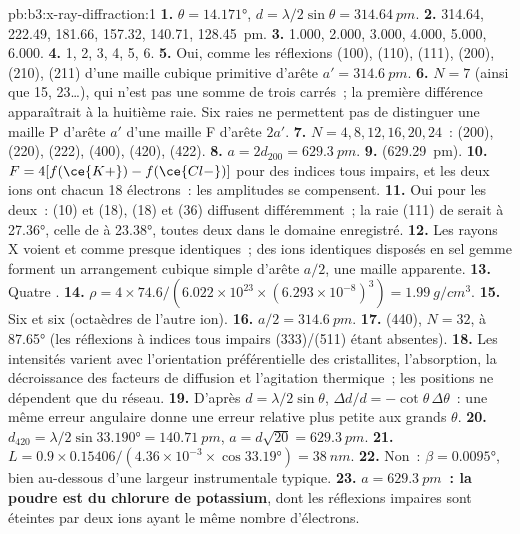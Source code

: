 \begin{solution}{pb:b3:x-ray-diffraction:1}
\textbf{1.} $\theta = \ang{14.171}$, $d = \lambda/2\sin\theta = \qty{314.64}{pm}$.
\textbf{2.} 314.64, 222.49, 181.66, 157.32, 140.71, \qty{128.45}{pm}.
\textbf{3.} 1.000, 2.000, 3.000, 4.000, 5.000, 6.000.
\textbf{4.} 1, 2, 3, 4, 5, 6.
\textbf{5.} Oui, comme les réflexions (100), (110), (111), (200), (210),
(211) d'une maille cubique primitive
d'arête $a' = \qty{314.6}{pm}$.
\textbf{6.} $N = 7$ (ainsi que 15, 23\dots), qui n'est pas une somme de
trois carrés~; la première différence apparaîtrait à la huitième raie.
Six raies ne permettent pas de distinguer une maille P d'arête $a'$
d'une maille F d'arête $2a'$.
\textbf{7.} $N = 4, 8, 12, 16, 20, 24$~: (200), (220), (222), (400), (420), (422).
\textbf{8.} $a = 2d_{200} = \qty{629.3}{pm}$.
\textbf{9.}  (\qty{629.29}{pm}).
\textbf{10.} $F = 4[f(\ce{K+}) - f(\ce{Cl-})]$ pour des indices tous
impairs, et les deux ions ont chacun 18
électrons~: les amplitudes se compensent.
\textbf{11.} Oui pour les deux~:  (10) et  (18), 
(18) et  (36)
diffusent différemment~; la raie (111) de  serait à
\ang{27.36}, celle de  à \ang{23.38},
toutes deux dans le domaine enregistré.
\textbf{12.} Les rayons X voient  et  comme presque
identiques~; des ions identiques disposés en sel gemme forment un
arrangement cubique simple d'arête $a/2$, une maille apparente.
\textbf{13.} Quatre .
\textbf{14.} $\rho = 4 \times 74.6/(6.022\times10^{23} \times (6.293\times10^{-8})^3) =
\qty{1.99}{g/cm^3}$.
\textbf{15.} Six et six (octaèdres de l'autre ion).
\textbf{16.} $a/2 = \qty{314.6}{pm}$.
\textbf{17.} (440), $N = 32$, à \ang{87.65} (les réflexions à indices
tous impairs (333)/(511) étant absentes).
\textbf{18.} Les intensités varient avec l'orientation préférentielle des
cristallites, l'absorption, la décroissance des facteurs de diffusion et
l'agitation thermique~; les positions ne dépendent que du réseau.
\textbf{19.} D'après $d = \lambda/2\sin\theta$, $\Delta d/d = -\cot\theta\,\Delta\theta$~:
une même erreur angulaire donne une erreur relative plus petite aux
grands $\theta$.
\textbf{20.} $d_{420} = \lambda/2\sin\ang{33.190} = \qty{140.71}{pm}$, $a = d\sqrt{20} =
\qty{629.3}{pm}$.
\textbf{21.} $L = 0.9 \times 0.15406/(4.36\times10^{-3} \times \cos\ang{33.19}) = \qty{38}{nm}$.
\textbf{22.} Non~: $\beta = \ang{0.0095}$, bien au-dessous d'une largeur
instrumentale typique.
\textbf{23.} \textbf{$a = \qty{629.3}{pm}$~: la poudre est du chlorure de
potassium}, dont les réflexions impaires sont éteintes par deux ions
ayant le même nombre d'électrons.
\end{solution}

